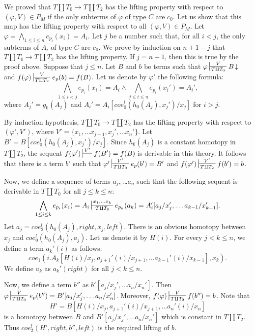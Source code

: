 \documentclass[reqno]{amsart}
\theoremstyle{definition}
\theoremstyle{remark}
\newcommand{\leftI}{\mathit{left}}
\newcommand{\rightI}{\mathit{right}}
\newcommand{\coe}{\mathit{coe}}
\numberwithin{figure}{section}
\begin{document}
We proved that $T \amalg T_0 \to T \amalg T_2$ has the lifting property with respect to $(\varphi,V) \in P_M$ if the only subterms of $\varphi$ of type $C$ are $c_0$.
Let us show that this map has the lifting property with respect to all $(\varphi,V) \in P_M$.
Let $\varphi = \bigwedge_{1 \leq i \leq n} e_{p_i}(x_i) = A_i$.
Let $j$ be a number such that, for all $i < j$, the only subterms of $A_i$ of type $C$ are $c_0$.
We prove by induction on $n + 1 - j$ that $T \amalg T_0 \to T \amalg T_2$ has the lifting property.
If $j = n + 1$, then this is true by the proof above.
Suppose that $j \leq n$.
Let $B$ and $b$ be terms such that $\varphi \sststile{T \amalg T_0}{V} B\!\downarrow$ and $f(\varphi) \sststile{T \amalg T_2}{V} e_p(b) = f(B)$.
Let us denote by $\varphi'$ the following formula:
\[ \bigwedge_{1 \leq i < j} e_{p_i}(x_i) = A_i \land \bigwedge_{j \leq i \leq n} e_{p_i}(x_i') = A_i', \]
where $A_j' = g_0(A_j)$ and $A_i' = A_i[\coe^l_0(h_0(A_j),x_j')/x_j]$ for $i > j$.

By induction hypothesis, $T \amalg T_0 \to T \amalg T_2$ has the lifting property with respect to $(\varphi',V')$, where $V' = \{ x_1, \ldots x_{j-1}, x_j', \ldots x_n' \}$.
Let $B' = B[\coe^l_0(h_0(A_j),x_j')/x_j]$.
Since $h_0(A_j)$ is a constant homotopy in $T \amalg T_2$, the sequent $f(\varphi') \sststile{}{V'} f(B') = f(B)$ is derivable in this theory.
It follows that there is a term $b'$ such that $\varphi' \sststile{T \amalg T_0}{V'} e_p(b') = B'$ and $f(\varphi') \sststile{T \amalg T_2}{V'} f(b') = b$.

Now, we define a sequence of terms $a_j$, \ldots $a_n$ such that the following sequent is derivable in $T \amalg T_0$ for all $j \leq k \leq n$:
\[ \bigwedge_{1 \leq i \leq k} e_{p_i}(x_i) = A_i \sststile{T \amalg T_0}{x_1, \ldots x_k} e_{p_k}(a_k) = A_i'[a_j/x_j', \ldots a_{k-1}/x_{k-1}']. \]
Let $a_j = \coe^l_2(h_0(A_j), \rightI, x_j, \leftI)$.
There is an obvious homotopy between $x_j$ and $\coe^l_0(h_0(A_j),a_j)$.
Let us denote it by $H(i)$.
For every $j < k \leq n$, we define a term $a_k'(i)$ as follows:
\[ \coe_1(i. A_k[H(i)/x_j, a_{j+1}'(i)/x_{j+1}, \ldots a_{k-1}'(i)/x_{k-1}], x_k). \]
We define $a_k$ as $a_k'(\rightI)$ for all $j < k \leq n$.

Now, we define a term $b''$ as $b'[a_j/x_j', \ldots a_n/x_n']$.
Then $\varphi \sststile{T \amalg T_0}{V} e_p(b'') = B'[a_j/x_j', \ldots a_n/x_n']$.
Moreover, $f(\varphi) \sststile{T \amalg T_2}{V} f(b'') = b$.
Note that
\[ H' = B[H(i)/x_j, a_{j+1}'(i)/x_{j+1}, \ldots a_n'(i)/x_n] \]
is a homotopy between $B$ and $B'[a_j/x_j', \ldots a_n/x_n']$ which is constant in $T \amalg T_2$.
Thus $\coe^l_2(H',\rightI,b'',\leftI)$ is the required lifting of $b$.
\end{document}

